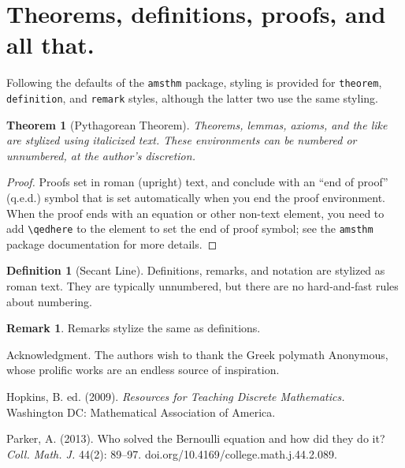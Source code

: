 \documentclass{article}
\theoremstyle{plain}
\newtheorem{theorem}{Theorem}
\theoremstyle{definition}
\newtheorem*{definition}{Definition}
\newtheorem*{remark}{Remark}
\begin{document}
\section{Theorems, definitions, proofs, and all that.}

Following the defaults of the \texttt{amsthm} package, styling is provided for \texttt{theorem}, \texttt{definition}, and \texttt{remark} styles, although the latter two use the same styling.

\begin{theorem}[Pythagorean Theorem]
Theorems, lemmas, axioms, and the like are stylized using italicized text. These environments can be numbered or unnumbered, at the author's discretion.
\end{theorem}

\begin{proof}
Proofs set in roman (upright) text, and conclude with an ``end of proof'' (q.e.d.) symbol that is set automatically when you end the proof environment.  When the proof ends with an equation or other non-text element, you need to add \verb~\qedhere~ to the element to set the end of proof symbol; see the \texttt{amsthm} package documentation for more details.
\end{proof}

\begin{definition}[Secant Line]
Definitions, remarks, and notation are stylized as roman text.  They are typically unnumbered, but there are no hard-and-fast rules about numbering.
\end{definition}

\begin{remark}
Remarks stylize the same as definitions.
\end{remark}


\begin{acknowledgment}{Acknowledgment.}
The authors wish to thank the Greek polymath Anonymous, whose prolific works are an endless source of inspiration.
\end{acknowledgment}

\begin{thebibliography}{2}
 Hopkins, B. ed. (2009). \textit{Resources for Teaching Discrete Mathematics.} Washington DC: Mathematical Association of America.

 Parker, A. (2013). Who solved the Bernoulli equation and how did they do it? \textit{Coll. Math. J.} 44(2): 89--97. doi.org/10.4169/college.math.j.44.2.089.

\end{thebibliography}
\end{document}
